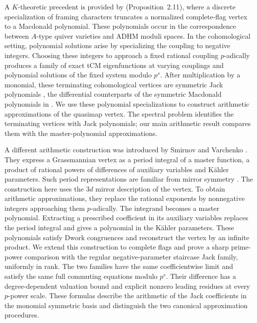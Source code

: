 \documentclass[11pt]{amsart}
\theoremstyle{definition}
\theoremstyle{remark}
\numberwithin{equation}{section}
\begin{document}
A $K$-theoretic precedent is provided by \cite{K21}
(Proposition~2.11), where a discrete specialization of framing
characters truncates a normalized complete-flag vertex to a
Macdonald polynomial. These polynomials occur in the
correspondence between $A$-type quiver varieties and ADHM moduli
spaces. In the cohomological setting, polynomial solutions arise
by specializing the coupling to negative integers. Choosing these
integers to approach a fixed rational coupling $p$-adically
produces a family of exact tCM eigenfunctions at varying
couplings and polynomial solutions of the fixed system modulo
$p^s$.
After multiplication by a monomial, these terminating
cohomological vertices are symmetric Jack polynomials
\cite{Mac95,NS13}, the differential counterparts of the
symmetric Macdonald polynomials in \cite{K21}.
We use these polynomial specializations to construct arithmetic
approximations of the quasimap vertex. The spectral problem
identifies the terminating vertices with Jack polynomials;
our main arithmetic result compares them with the
master-polynomial approximations.

A different arithmetic construction was introduced by Smirnov
and Varchenko \cite{SV23}. They express a Grassmannian vertex
as a period integral
of a master function, a product of rational powers of differences
of auxiliary variables and K\"ahler parameters. Such period
representations are familiar from mirror symmetry
\cite{Hori03}. The construction here uses the $3d$ mirror
description of the vertex.
To obtain arithmetic approximations, they replace the rational
exponents by nonnegative integers approaching them $p$-adically.
The integrand becomes a master polynomial. Extracting a prescribed
coefficient in its auxiliary variables replaces the period
integral and gives a polynomial in the K\"ahler parameters.
These polynomials satisfy Dwork congruences and reconstruct
the vertex by an infinite product.
We extend this construction to complete flags and prove a sharp
prime-power comparison with the regular negative-parameter
staircase Jack family, uniformly in rank. The two families have
the same coefficientwise limit and satisfy the same full
commuting equations modulo $p^s$. Their difference has a
degree-dependent valuation bound and explicit nonzero leading
residues at every $p$-power scale. These formulas describe the
arithmetic of the Jack coefficients in the monomial symmetric
basis and distinguish the two canonical approximation procedures.
\end{document}
